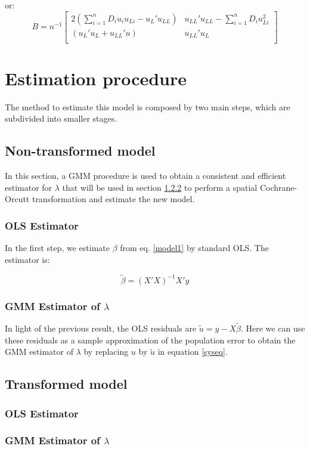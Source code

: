 \documentclass{article}
\begin{document}
or:
\[
B
=n^{-1}
\left[ \begin{array}{cc}
    2 (\sum_{i=1}^nD_i u_i u_{Li} - u_L' u_{LL}) &
    u_{LL}'u_{LL} - \sum_{i=1}^n D_i u_{Li}^2\\
    (u_L'u_L +u_{LL}'u) & u_{LL}'u_L \\
\end{array} \right]
\]

\section{Estimation procedure}
The method to estimate this model is composed by
two main steps, which are subdivided into smaller stages.

\subsection{Non-transformed model}
\label{s1}
In this section, a GMM procedure is used to obtain a consistent and efficient
estimator for $\lambda$ that will be used in section \ref{s2} to perform a
spatial Cochrane-Orcutt transformation and estimate the new model.

\subsubsection{OLS Estimator}
In the first step, we estimate $\beta$ from eq. \ref{model1} by standard OLS.
The estimator is:

\begin{equation}
    \tilde{\beta} = (X'X)^{-1}X'y
    \label{ols1}
\end{equation}

\subsubsection{GMM Estimator of $\lambda$}
In light of  the previous result, the OLS residuals are $\tilde{u} = y -
X\tilde{\beta}$. Here we can use these residuals as a sample approximation of
the population error to obtain the GMM estimator of $\lambda$ by replacing $u$ by
$\tilde{u}$ in equation \ref{syseq}.

\subsection{Transformed model}

\subsubsection{OLS Estimator}
\subsubsection{GMM Estimator of $\lambda$}

\label{s2}
\end{document}

